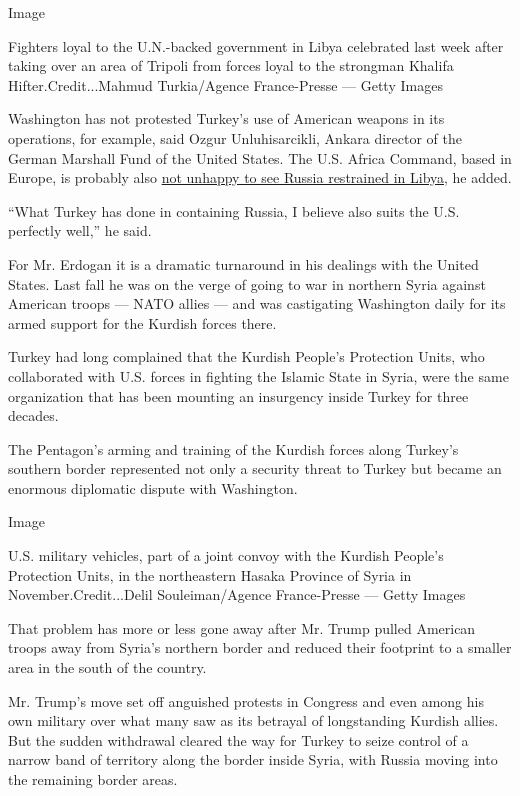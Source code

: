 Image

Fighters loyal to the U.N.-backed government in Libya celebrated last
week after taking over an area of Tripoli from forces loyal to the
strongman Khalifa Hifter.Credit...Mahmud Turkia/Agence France-Presse ---
Getty Images

Washington has not protested Turkey's use of American weapons in its
operations, for example, said Ozgur Unluhisarcikli, Ankara director of
the German Marshall Fund of the United States. The U.S. Africa Command,
based in Europe, is probably also
\href{https://www.nytimes.com/2020/04/14/world/middleeast/libya-russia-john-bolton.html?searchResultPosition=6}{not
unhappy to see Russia restrained in Libya}, he added.

``What Turkey has done in containing Russia, I believe also suits the
U.S. perfectly well,'' he said.

For Mr. Erdogan it is a dramatic turnaround in his dealings with the
United States. Last fall he was on the verge of going to war in northern
Syria against American troops --- NATO allies --- and was castigating
Washington daily for its armed support for the Kurdish forces there.

Turkey had long complained that the Kurdish People's Protection Units,
who collaborated with U.S. forces in fighting the Islamic State in
Syria, were the same organization that has been mounting an insurgency
inside Turkey for three decades.

The Pentagon's arming and training of the Kurdish forces along Turkey's
southern border represented not only a security threat to Turkey but
became an enormous diplomatic dispute with Washington.

Image

U.S. military vehicles, part of a joint convoy with the Kurdish People's
Protection Units, in the northeastern Hasaka Province of Syria in
November.Credit...Delil Souleiman/Agence France-Presse --- Getty Images

That problem has more or less gone away after Mr. Trump pulled American
troops away from Syria's northern border and reduced their footprint to
a smaller area in the south of the country.

Mr. Trump's move set off anguished protests in Congress and even among
his own military over what many saw as its betrayal of longstanding
Kurdish allies. But the sudden withdrawal cleared the way for Turkey to
seize control of a narrow band of territory along the border inside
Syria, with Russia moving into the remaining border areas.

